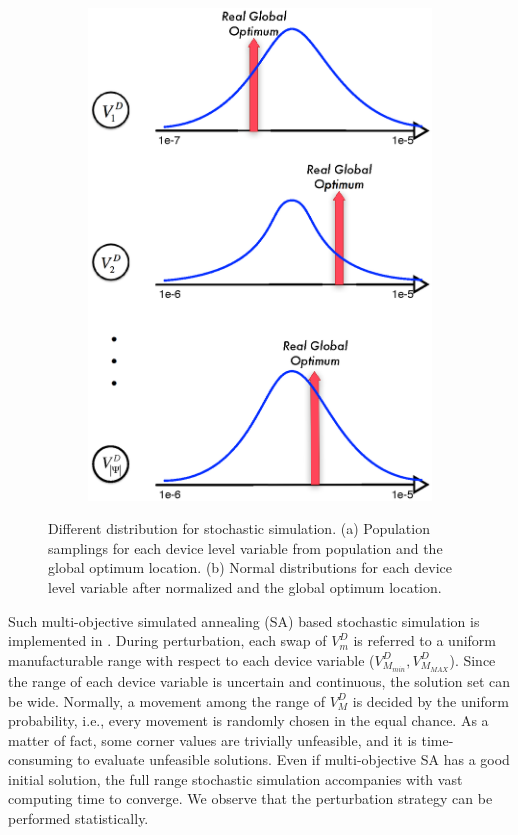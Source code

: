 \begin{figure}[ht]
\begin{subfigure}[t]{0.4\textwidth}
        \includegraphics[width=\textwidth]{Fig/Chapter2/norPopDis.eps}
      \end{subfigure}
      \caption
      {
        Different distribution for stochastic simulation. (a) Population samplings for each device level variable from population and the global optimum location. (b) Normal distributions for each device level variable after normalized and the global optimum location.
      }\label{fig:optimumValleys}
  \end{figure}

  Such multi-objective simulated annealing (SA) based stochastic simulation is implemented in \cite{PerfMap_ISQED2011}. During perturbation, each swap of $V^D_m$ is referred to a uniform manufacturable range with respect to each device variable ($V^D_{M_{min}},V^D_{M_{MAX}}$). Since the range of each device variable is uncertain and continuous, the solution set can be wide. Normally, a movement among the range of $V^D_M$ is decided by the uniform probability, i.e., every movement is randomly chosen in the equal chance. As a matter of fact, some corner values are trivially unfeasible, and it is time-consuming to evaluate unfeasible solutions. Even if multi-objective SA has a good initial solution, the full range stochastic simulation accompanies with vast computing time to converge. We observe that the perturbation strategy can be performed statistically. 
    

